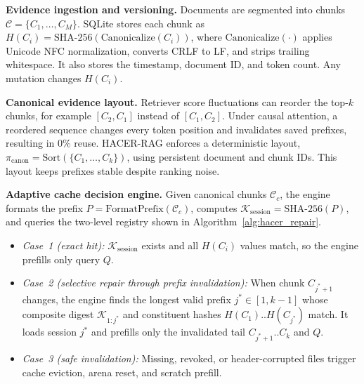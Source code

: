 \documentclass[10pt,conference]{IEEEtran}
\newcommand{\systemname}{HACER-RAG}
\begin{document}
\textbf{Evidence ingestion and versioning.} Documents are segmented into chunks $\mathcal{C}=\{C_1,\dots,C_M\}$. SQLite stores each chunk as $H(C_i)=\text{SHA-256}(\text{Canonicalize}(C_i))$, where $\text{Canonicalize}(\cdot)$ applies Unicode NFC normalization, converts CRLF to LF, and strips trailing whitespace. It also stores the timestamp, document ID, and token count. Any mutation changes $H(C_i)$.

\textbf{Canonical evidence layout.} Retriever score fluctuations can reorder the top-$k$ chunks, for example $[C_2,C_1]$ instead of $[C_1,C_2]$. Under causal attention, a reordered sequence changes every token position and invalidates saved prefixes, resulting in 0\% reuse. \systemname{} enforces a deterministic layout, $\pi_{\text{canon}}=\text{Sort}(\{C_1,\dots,C_k\})$, using persistent document and chunk IDs. This layout keeps prefixes stable despite ranking noise.

\textbf{Adaptive cache decision engine.} Given canonical chunks $\mathcal{C}_c$, the engine formats the prefix $P=\text{FormatPrefix}(\mathcal{C}_c)$, computes $\mathcal{K}_{\text{session}}=\text{SHA-256}(P)$, and queries the two-level registry shown in Algorithm~\ref{alg:hacer_repair}.
\begin{itemize}
  \item \emph{Case~1 (exact hit):} $\mathcal{K}_{\text{session}}$ exists and all $H(C_i)$ values match, so the engine prefills only query $Q$.
  \item \emph{Case~2 (selective repair through prefix invalidation):} When chunk $C_{j^*+1}$ changes, the engine finds the longest valid prefix $j^* \in [1,k{-}1]$ whose composite digest $\mathcal{K}_{1:j^*}$ and constituent hashes $H(C_1)..H(C_{j^*})$ match. It loads session $j^*$ and prefills only the invalidated tail $C_{j^*+1}..C_k$ and $Q$.
  \item \emph{Case~3 (safe invalidation):} Missing, revoked, or header-corrupted files trigger cache eviction, arena reset, and scratch prefill.
\end{itemize}
\end{document}
